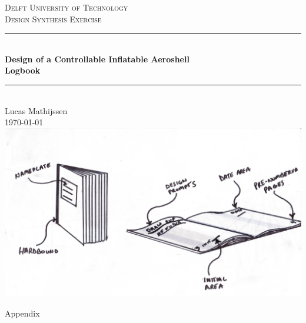 \documentclass[12pt]{article}
\newcommand{\HRule}{\rule{\linewidth}{0.04cm}}
\begin{document}
\clearpage
\thispagestyle{empty}

\begin{center}

\textsc{\LARGE Delft University of Technology}\\[0.3cm]
\textsc{\Large Design Synthesis Exercise}\\[0.5cm]

\HRule \\[0.4cm]
{\Large \bfseries Design of a Controllable Inflatable Aeroshell}\\[0.2cm]
{\Huge \bfseries Logbook}\\[0.2cm]
\HRule \\[1.2cm]

\vspace{10mm}
Lucas Mathijssen
\\
\today
\\
\includegraphics[width=16cm]{Figures/notebooksketch.jpg}

\end{center}


\newpage
{}
\tableofcontents


\newpage
{}
\newpage

\newpage

\newpage

\newpage

\newpage

\newpage

\newpage


 Appendix
\newpage
\appendix

\end{document}
